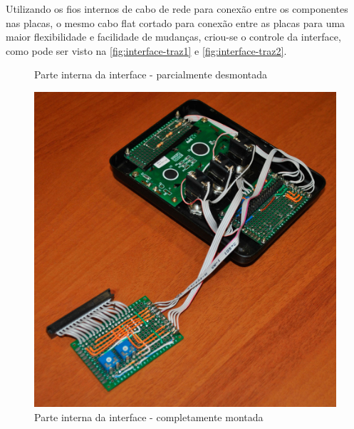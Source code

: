 Utilizando os fios internos de cabo de rede para conexão entre os componentes nas placas, o mesmo cabo flat cortado para conexão entre as placas para uma maior flexibilidade e facilidade de mudanças, criou-se o controle da interface, como pode ser visto na \autoref{fig:interface-traz1} e \autoref{fig:interface-traz2}.

\begin{figure}[htb]
	\centering
 	\begin{minipage}{0.45\textwidth}
		\centering
		\caption{\label{fig:interface-traz1}Parte interna da interface - parcialmente desmontada}
		\includegraphics[width=1\textwidth]{img/interface-traz1.jpg}
	\end{minipage}
	\hfill
	\begin{minipage}{0.45\textwidth}
		\centering
		\caption{\label{fig:interface-traz2}Parte interna da interface - completamente montada}

\end{minipage}
\end{figure}

